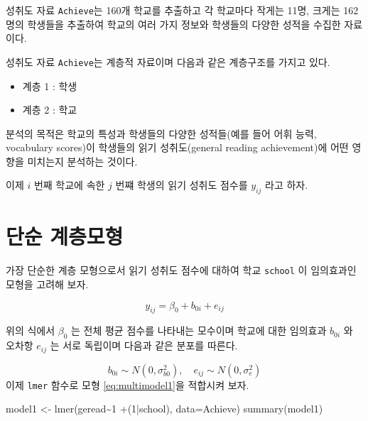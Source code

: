 \documentclass[
]{book}
\newenvironment{Shaded}{\begin{snugshade}}{\end{snugshade}}
\newcommand{\AttributeTok}[1]{\textcolor[rgb]{0.77,0.63,0.00}{#1}}
\newcommand{\DecValTok}[1]{\textcolor[rgb]{0.00,0.00,0.81}{#1}}
\newcommand{\FunctionTok}[1]{\textcolor[rgb]{0.00,0.00,0.00}{#1}}
\newcommand{\NormalTok}[1]{#1}
\newcommand{\OtherTok}[1]{\textcolor[rgb]{0.56,0.35,0.01}{#1}}
\newcommand{\SpecialCharTok}[1]{\textcolor[rgb]{0.00,0.00,0.00}{#1}}
\providecommand{\tightlist}{%
  \setlength{\itemsep}{0pt}\setlength{\parskip}{0pt}}
\begin{document}
성취도 자료 \texttt{Achieve}는 160개 학교를 추출하고 각 학교마다 작게는 11명, 크게는 162명의 학생들을 추출하여 학교의 여러 가지 정보와 학생들의 다양한 성적을 수집한 자료이다.

성취도 자료 \texttt{Achieve}는 계층적 자료이며 다음과 같은 계층구조를 가지고 있다.

\begin{itemize}
\tightlist
\item
  계층 1 : 학생
\item
  계층 2 : 학교
\end{itemize}

분석의 목적은 학교의 특성과 학생들의 다양한 성적들(예를 들어 어휘 능력, vocabulary scores)이 학생들의 읽기 성취도(general reading achievement)에 어떤 영향을 미치는지 분석하는 것이다.

이제 \(i\) 번째 학교에 속한 \(j\) 번쨰 학생의 읽기 성취도 점수를 \(y_{ij}\) 라고 하자.

\hypertarget{uxb2e8uxc21c-uxacc4uxce35uxbaa8uxd615}{%
\section{단순 계층모형}\label{uxb2e8uxc21c-uxacc4uxce35uxbaa8uxd615}}

가장 단순한 계층 모형으로서 읽기 성취도 점수에 대하여 학교 \texttt{school} 이 임의효과인 모형을 고려해 보자.

\begin{equation}
y_{ij} = \beta_0 + b_{0i} + e_{ij}
\label{eq:multimodel1}
\end{equation}

위의 식에서 \(\beta_0\) 는 전체 평균 점수를 나타내는 모수이며 학교에 대한 임의효과 \(b_{0i}\) 와 오차항 \(e_{ij}\) 는 서로 독립이며 다음과 같은 분포를 따른다.

\[ b_{0i} \sim N(0, \sigma_{b0}^2 ) , \quad e_{ij} \sim N(0, \sigma_e^2) \]
이제 \texttt{lmer} 함수로 모형 \eqref{eq:multimodel1}을 적합시켜 보자.

\begin{Shaded}
\begin{Highlighting}[]
\NormalTok{model1 }\OtherTok{\textless{}{-}} \FunctionTok{lmer}\NormalTok{(geread}\SpecialCharTok{\textasciitilde{}}\DecValTok{1} \SpecialCharTok{+}\NormalTok{(}\DecValTok{1}\SpecialCharTok{|}\NormalTok{school), }\AttributeTok{data=}\NormalTok{Achieve)}
\FunctionTok{summary}\NormalTok{(model1)}
\end{Highlighting}
\end{Shaded}
\end{document}
